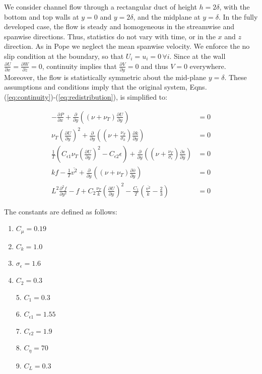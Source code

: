 \documentclass[a4paper,11pt]{article}
\newcommand{\pderiv}[3][]{%
  \ensuremath{\frac{\partial^{#1} {#2}}{\partial {#3}^{#1}}}}
\newcommand{\ep}{\epsilon}
\begin{document}
We consider channel flow through a rectangular duct of height $h= 2\delta$, with
the bottom and top walls at $y=0$ and $y=2\delta$, and the midplane at
$y=\delta$. In the fully developed case, the flow is steady and homogeneous in
the streamwise and spanwise directions. Thus, statistics do not vary with time,
or in the $x$ and $z$ direction. As in Pope \cite{pope} we neglect the mean spanwise
velocity.  We enforce the no slip condition at the boundary, so that
$U_i=u_i=0 \, \forall i$. Since at the wall
$\pderiv{U}{x}=\pderiv{W}{z} = 0$, continuity implies that
$\pderiv{V}{y}=0$ and thus $V=0$ everywhere. Moreover, the flow is statistically
symmetric about the mid-plane $y = \delta$. These assumptions and conditions
imply that the original system, Eqns.
(\ref{eq:continuity})-(\ref{eq:redistribution}), is simplified to: 

\begin{align}
	\label{eq:ssv2f1}
        -\pderiv{P}{x} +
\pderiv{}{y}\left((\nu+\nu_T)\pderiv{U}{y}\right) &= 0\\
        \nu_T\left(\pderiv{U}{y}\right)^2 + 
\pderiv{}{y}\left((\nu+\frac{\nu_T}{\sigma_k})\pderiv{k}{y}\right) &=0\\
        \frac{1}{T}\left(C_{\ep
1}\nu_T\left(\pderiv{U}{y}\right)^2 - C_{\ep 2}\ep\right) + 
\pderiv{}{y}\left((\nu+\frac{\nu_T}{\sigma_\ep})\pderiv{\ep}{y}\right) &=0 \\
         kf - \frac{1}{T}\overline{v^2} +
\pderiv{}{y}\left((\nu+\nu_T)\pderiv{\overline{v}}{y}\right) &=0 \\
         L^2\frac{\partial^2 f}{\partial y^2} -f  +
C_2\frac{\nu_T}{k}\left(\pderiv{U}{y}\right)^2 -
\frac{C_1}{T}\left(\frac{\overline{v^2}}{k}-\frac{2}{3}\right) &=0
	\label{eq:ssv2f5}
\end{align}

The constants are defined as follows: 
\begin{multicols}{2}
\begin{enumerate}
	\item $C_\mu = 0.19$
        \item $C_k = 1.0$
	\item $\sigma_\ep = 1.6$
	\item $C_2 = 0.3$	
\end{enumerate}
\columnbreak 

\begin{itemize}
	\item[5.] $C_1 = 0.3$
	\item[6.] $C_{\ep 1} = 1.55$
	\item[7.] $C_{\ep 2} = 1.9$  
	\item[8.] $C_\eta = 70$
	\item[9.] $C_L = 0.3$
\end{itemize}
\end{multicols}
\end{document}
